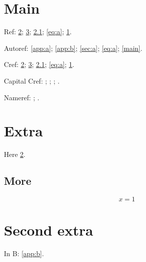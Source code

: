 \documentclass{report}
\begin{document}
\chapter{Main}\label{main}
Ref: \ref{app:a}; \ref{app:b}; \ref{sec:a}; \eqref{eq:a}; \ref{main}.

Autoref: \autoref{app:a}; \autoref{app:b}; \autoref{sec:a}; \autoref{eq:a}; \autoref{main}.

Cref: \cref{app:a}; \cref{app:b}; \cref{sec:a}; \cref{eq:a}; \cref{main}.

Capital Cref: ; ; ; .

Nameref: ; .
\appendix
\chapter{Extra}\label{app:a}
Here \ref{app:a}.
\section{More}\label{sec:a}
\begin{equation}
x = 1 \label{eq:a}
\end{equation}
\chapter{Second extra}\label{app:b}
In B: \autoref{app:b}.
\end{document}
